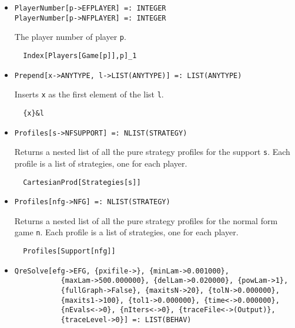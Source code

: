 \begin{itemize}
\item{}
\protect \large \begin{verbatim}
PlayerNumber[p->EFPLAYER] =: INTEGER 
PlayerNumber[p->NFPLAYER] =: INTEGER 
\end{verbatim}\normalsize

\bd 
The player number of player \verb+p+.
\begin{verbatim}
  Index[Players[Game[p]],p]_1
\end{verbatim} 
\ed

\item{}
\protect \large \begin{verbatim}
Prepend[x->ANYTYPE, l->LIST(ANYTYPE)] =: LIST(ANYTYPE) 
\end{verbatim}\normalsize

\bd 
Inserts \verb+x+ as the first element of the list \verb+l+.  
\begin{verbatim}
  {x}&l
\end{verbatim} 
\ed

\item{}
\protect \large \begin{verbatim}
Profiles[s->NFSUPPORT] =: NLIST(STRATEGY) 
\end{verbatim}\normalsize

\bd 
Returns a nested list of all the pure strategy profiles for the support
\verb+s+.  Each profile is a list of strategies, one for each player.  
\begin{verbatim}
  CartesianProd[Strategies[s]]
\end{verbatim} 
\ed


\item{}
\protect \large \begin{verbatim}
Profiles[nfg->NFG] =: NLIST(STRATEGY) 
\end{verbatim}\normalsize

\bd 
Returns a nested list of all the pure strategy profiles for the normal
form game \verb+n+.  Each profile is a list of strategies, one for
each player.
\begin{verbatim}
  Profiles[Support[nfg]]
\end{verbatim} 
\ed


\item{}
\protect \large \begin{verbatim}
QreSolve[efg->EFG, {pxifile->}, {minLam->0.001000}, 
           {maxLam->500.000000}, {delLam->0.020000}, {powLam->1}, 
           {fullGraph->False}, {maxitsN->20}, {tolN->0.000000}, 
           {maxits1->100}, {tol1->0.000000}, {time<->0.000000}, 
           {nEvals<->0}, {nIters<->0}, {traceFile<->(Output)}, 
           {traceLevel->0}] =: LIST(BEHAV) 
\end{verbatim}\normalsize


\end{itemize}

